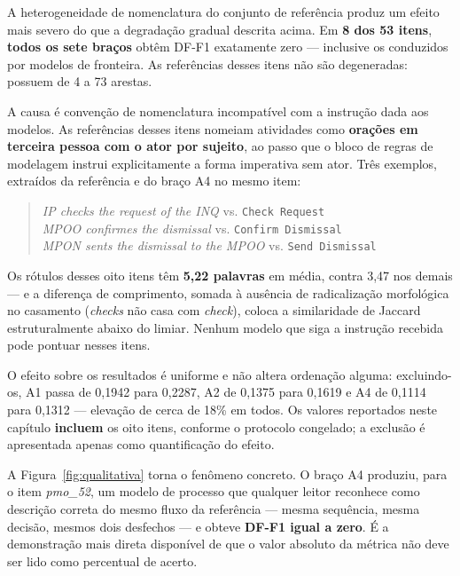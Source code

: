 A heterogeneidade de nomenclatura do conjunto de referência produz um efeito mais severo do que a degradação gradual descrita acima. Em \textbf{8 dos 53 itens}, \textbf{todos os sete braços} obtêm DF-F1 exatamente zero --- inclusive os conduzidos por modelos de fronteira. As referências desses itens não são degeneradas: possuem de 4 a 73 arestas.

A causa é convenção de nomenclatura incompatível com a instrução dada aos modelos. As referências desses itens nomeiam atividades como \textbf{orações em terceira pessoa com o ator por sujeito}, ao passo que o bloco de regras de modelagem instrui explicitamente a forma imperativa sem ator. Três exemplos, extraídos da referência e do braço A4 no mesmo item:

\begin{quote}\small
	\textit{IP checks the request of the INQ} \quad vs. \quad \texttt{Check Request}\\
	\textit{MPOO confirmes the dismissal} \quad vs. \quad \texttt{Confirm Dismissal}\\
	\textit{MPON sents the dismissal to the MPOO} \quad vs. \quad \texttt{Send Dismissal}
\end{quote}

Os rótulos desses oito itens têm \textbf{5,22 palavras} em média, contra 3,47 nos demais --- e a diferença de comprimento, somada à ausência de radicalização morfológica no casamento (\textit{checks} não casa com \textit{check}), coloca a similaridade de Jaccard estruturalmente abaixo do limiar. Nenhum modelo que siga a instrução recebida pode pontuar nesses itens.

O efeito sobre os resultados é uniforme e não altera ordenação alguma: excluindo-os, A1 passa de 0,1942 para 0,2287, A2 de 0,1375 para 0,1619 e A4 de 0,1114 para 0,1312 --- elevação de cerca de 18\% em todos. Os valores reportados neste capítulo \textbf{incluem} os oito itens, conforme o protocolo congelado; a exclusão é apresentada apenas como quantificação do efeito.



A Figura~\ref{fig:qualitativa} torna o fenômeno concreto. O braço A4 produziu, para o item \textit{pmo\_52}, um modelo de processo que qualquer leitor reconhece como descrição correta do mesmo fluxo da referência --- mesma sequência, mesma decisão, mesmos dois desfechos --- e obteve \textbf{DF-F1 igual a zero}. É a demonstração mais direta disponível de que o valor absoluto da métrica não deve ser lido como percentual de acerto.

